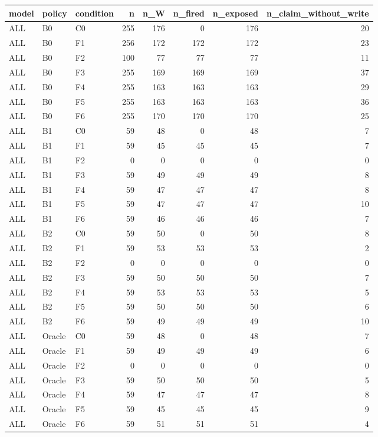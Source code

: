\begin{tabular}{lllrrrrr}
\toprule
model & policy & condition & n & n\_W & n\_fired & n\_exposed & n\_claim\_without\_write \\
\midrule
ALL & B0 & C0 & 255 & 176 & 0 & 176 & 20 \\
ALL & B0 & F1 & 256 & 172 & 172 & 172 & 23 \\
ALL & B0 & F2 & 100 & 77 & 77 & 77 & 11 \\
ALL & B0 & F3 & 255 & 169 & 169 & 169 & 37 \\
ALL & B0 & F4 & 255 & 163 & 163 & 163 & 29 \\
ALL & B0 & F5 & 255 & 163 & 163 & 163 & 36 \\
ALL & B0 & F6 & 255 & 170 & 170 & 170 & 25 \\
ALL & B1 & C0 & 59 & 48 & 0 & 48 & 7 \\
ALL & B1 & F1 & 59 & 45 & 45 & 45 & 7 \\
ALL & B1 & F2 & 0 & 0 & 0 & 0 & 0 \\
ALL & B1 & F3 & 59 & 49 & 49 & 49 & 8 \\
ALL & B1 & F4 & 59 & 47 & 47 & 47 & 8 \\
ALL & B1 & F5 & 59 & 47 & 47 & 47 & 10 \\
ALL & B1 & F6 & 59 & 46 & 46 & 46 & 7 \\
ALL & B2 & C0 & 59 & 50 & 0 & 50 & 8 \\
ALL & B2 & F1 & 59 & 53 & 53 & 53 & 2 \\
ALL & B2 & F2 & 0 & 0 & 0 & 0 & 0 \\
ALL & B2 & F3 & 59 & 50 & 50 & 50 & 7 \\
ALL & B2 & F4 & 59 & 53 & 53 & 53 & 5 \\
ALL & B2 & F5 & 59 & 50 & 50 & 50 & 6 \\
ALL & B2 & F6 & 59 & 49 & 49 & 49 & 10 \\
ALL & Oracle & C0 & 59 & 48 & 0 & 48 & 7 \\
ALL & Oracle & F1 & 59 & 49 & 49 & 49 & 6 \\
ALL & Oracle & F2 & 0 & 0 & 0 & 0 & 0 \\
ALL & Oracle & F3 & 59 & 50 & 50 & 50 & 5 \\
ALL & Oracle & F4 & 59 & 47 & 47 & 47 & 8 \\
ALL & Oracle & F5 & 59 & 45 & 45 & 45 & 9 \\
ALL & Oracle & F6 & 59 & 51 & 51 & 51 & 4 \\

\end{tabular}
